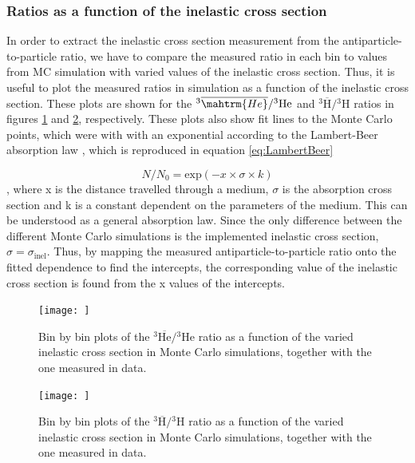 \subsubsection{Ratios as a function of the inelastic cross section}
In order to extract the inelastic cross section measurement from the antiparticle-to-particle ratio, we have to compare the measured ratio in each bin to values from MC simulation with varied values of the inelastic cross section. Thus, it is useful to plot the measured ratios in simulation as a function of the inelastic cross section. These plots are shown for the $^3\overline{\mahtrm{He}}/{^3\mathrm{He}}$ and $^3\overline{\mathrm{H}}/{^3\mathrm{H}}$ ratios in figures \ref{fig:Meth:RatiosAsFunctionsOfSigmaInel3He} and \ref{fig:Meth:RatiosAsFunctionsOfSigmaInel3H}, respectively. These plots also show fit lines to the Monte Carlo points, which were with with an exponential according to the Lambert-Beer absorption law \cite{}, which is reproduced in equation \ref{eq:LambertBeer}

\begin{equation}\label{eq:LambertBeer}
    N/N_0 = \mathrm{exp}\left( -x\times \sigma \times k \right)
\end{equation}
, where x is the distance travelled through a medium, $\sigma$ is the absorption cross section and k is a constant dependent on the parameters of the medium. This can be understood as a general absorption law. Since the only difference between the different Monte Carlo simulations is the implemented inelastic cross section, $\sigma = \sigma_\mathrm{inel}$. Thus, by mapping the measured antiparticle-to-particle ratio onto the fitted dependence to find the intercepts, the corresponding value of the inelastic cross section is found from the x values of the intercepts. 

\begin{figure}[htpb]
    \centering
    \texttt{[image: ]}
    \caption{Bin by bin plots of the $^3\overline{\mathrm{He}}/{^3\mathrm{He}}$ ratio as a function of the varied inelastic cross section in Monte Carlo simulations, together with the one measured in data.}
    \label{fig:Meth:RatiosAsFunctionsOfSigmaInel3He}
\end{figure}

\begin{figure}[htpb]
    \centering
    \texttt{[image: ]}
    \caption{Bin by bin plots of the $^3\overline{\mathrm{H}}/{^3\mathrm{H}}$ ratio as a function of the varied inelastic cross section in Monte Carlo simulations, together with the one measured in data.}
    \label{fig:Meth:RatiosAsFunctionsOfSigmaInel3H}
\end{figure}

